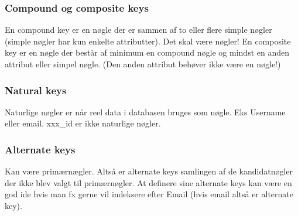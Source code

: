 \subsubsection{Compound og composite keys}
En compound key er en nøgle der er sammen af to eller flere simple nøgler (simple nøgler har kun enkelte attributter). Det skal være nøgler!
En composite key er en nøgle der består af minimum en compound nøgle og mindst en anden attribut eller simpel nøgle. (Den anden attribut behøver ikke være en nøgle!)

\subsubsection{Natural keys}
Naturlige nøgler er når reel data i databasen bruges som nøgle. Eks Username eller email. xxx_id er ikke naturlige nøgler.

\subsubsection{Alternate keys}
Kan være primærnægler. Altså er alternate keys samlingen af de kandidatnøgler der ikke blev valgt til primærnøgler. At definere sine alternate keys kan være en god ide hvis man fx gerne vil indeksere efter Email (hvis email altså er alternate key).